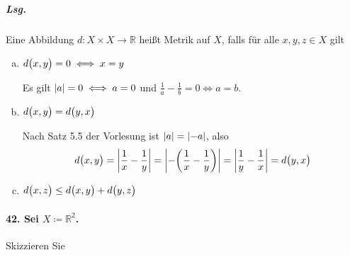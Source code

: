 \documentclass{scrreprt}
\begin{document}
\subparagraph{Lsg.} Eine Abbildung $d \colon X \times X \to \mathbb{R}$
heißt Metrik auf $X$, falls für alle $x, y, z \in X$ gilt
\begin{enumerate}[(a)]
\item $d\qty\big(x, y) = 0 \iff x = y$

  Es gilt $\abs{a} = 0 \iff a = 0$ und
  $\frac{1}{a} - \frac{1}{b} = 0 \iff a = b$.
\item $d\qty\big(x, y) = d\qty\big(y, x)$

  Nach Satz 5.5 der Vorlesung ist $\abs{a} = \abs{-a}$, also
  \[
    d\qty\big(x, y) = \abs{\frac{1}{x} - \frac{1}{y}}
    = \abs{-\qty(\frac{1}{x} - \frac{1}{y})}
    = \abs{\frac{1}{y} - \frac{1}{x}}
    = d\qty\big(y, x)
  \]
\item $d\qty\big(x, z) \leq d\qty\big(x, y) + d\qty\big(y, z)$

\end{enumerate}



\newpage
\paragraph{42. Sei $X \coloneqq \mathbb{R}^2$.}
Skizzieren Sie
\end{document}
